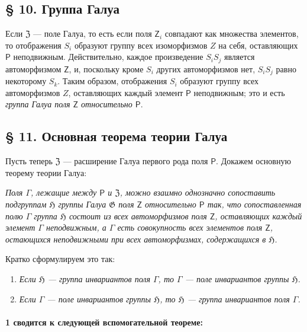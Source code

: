 \documentclass[11pt]{article}
\begin{document}
\subsection*{§ 10. Группа Галуа}\label{die-galoissche-gruppe}

Если \(\mathfrak Z\) --- поле Галуа, то есть если поля \(\mathsf{Z}_i\) совпадают как множества элементов, то отображения \(S_i\) образуют группу всех изоморфизмов \(Z\) на себя, оставляющих \(\mathsf P\) неподвижным. Действительно, каждое произведение \(S_iS_j\) является автоморфизмом \(\mathsf{Z}\), и, поскольку кроме \(S_i\) других автоморфизмов нет, \(S_iS_j\) равно некоторому \(S_k\). Таким образом, отображения \(S_i\) образуют группу всех автоморфизмов \(Z\), оставляющих каждый элемент \(\mathsf P\) неподвижным; это и есть \emph{группа Галуа поля \(\mathsf{Z}\) относительно \(\mathsf P\)}.

\subsection*{§ 11. Основная теорема теории Галуа}\label{der-hauptsatz-der-galoisschen-theorie}

Пусть теперь \(\mathfrak Z\) --- расширение Галуа первого рода поля \(\mathsf P\). Докажем основную теорему теории Галуа:

\emph{Поля \(\Gamma\), лежащие между \(\mathsf P\) и \(\mathfrak Z\), можно взаимно однозначно сопоставить подгруппам \(\mathfrak H\) группы Галуа \(\mathfrak G\) поля \(\mathsf{Z}\) относительно \(\mathsf P\) так, что сопоставленная полю \(\Gamma\) группа \(\mathfrak H\) состоит из всех автоморфизмов поля \(\mathsf{Z}\), оставляющих каждый элемент \(\Gamma\) неподвижным, а \(\Gamma\) есть совокупность всех элементов поля \(\mathsf{Z}\), остающихся неподвижными при всех автоморфизмах, содержащихся в \(\mathfrak H\).}

Кратко сформулируем это так:

\begin{enumerate}
\item \emph{Если \(\mathfrak H\) --- группа инвариантов поля \(\Gamma\), то \(\Gamma\) --- поле инвариантов группы \(\mathfrak H\).}
\item \emph{Если \(\Gamma\) --- поле инвариантов группы \(\mathfrak H\), то \(\mathfrak H\) --- группа инвариантов поля \(\Gamma\).}
\end{enumerate}

\paragraph{1 сводится к следующей вспомогательной теореме:}\label{laesst-sich-zurueckfuehren-auf-den-hilfssatz}
\end{document}
